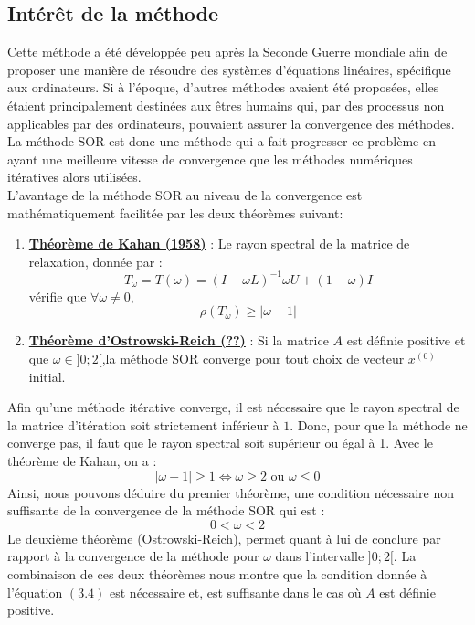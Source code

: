 \subsection{Intérêt de la méthode}
Cette méthode a été développée peu après la Seconde Guerre mondiale afin de proposer une manière de résoudre des systèmes d'équations linéaires, spécifique aux ordinateurs. Si à l'époque, d'autres méthodes avaient été proposées, elles étaient principalement destinées aux êtres humains qui, par des processus non applicables par des ordinateurs, pouvaient assurer la convergence des méthodes. La méthode SOR est donc une méthode qui a fait progresser ce problème en ayant une meilleure vitesse de convergence que les méthodes numériques itératives alors utilisées.\\

L'avantage de la méthode SOR au niveau de la convergence est mathématiquement facilitée par les deux théorèmes suivant:
\begin{enumerate}
	\item \textbf{\underline{Théorème de Kahan (1958)}} : Le rayon spectral de la matrice de relaxation, donnée par :
	$$
	T_\omega=T(\omega)=(I-\omega L)^{-1}{\omega U +(1-\omega)I}
	$$
	vérifie que $\forall \omega \neq 0$,
	$$
	\rho(T_\omega)\geq|\omega -1|
	$$
	\item \textbf{\underline{Théorème d'Ostrowski-Reich (??)}} : Si la matrice $A$ est définie positive et que $\omega \in ]0;2[$,la méthode SOR converge pour tout choix de vecteur $x^{(0)}$ initial.
\end{enumerate}
Afin qu'une méthode itérative converge, il est nécessaire que le rayon spectral de la matrice d'itération soit strictement inférieur à $1$. Donc, pour que la méthode ne converge pas, il faut que le rayon spectral soit supérieur ou égal à 1. Avec le théorème de Kahan, on a :
$$
|\omega -1|\geq 1 \Leftrightarrow \omega \geq 2 \text{ ou } \omega \leq 0 
$$
Ainsi, nous pouvons déduire du premier théorème, une condition nécessaire non suffisante de la convergence de la méthode SOR qui est :
\begin{equation}
0<\omega<2
\end{equation}
Le deuxième théorème (Ostrowski-Reich), permet quant à lui de conclure par rapport à la convergence de la méthode pour $\omega$ dans l'intervalle $]0;2[$. La combinaison de ces deux théorèmes nous montre que la condition donnée à l'équation $(3.4)$ est nécessaire et, est suffisante dans le cas où $A$ est définie positive.\\

